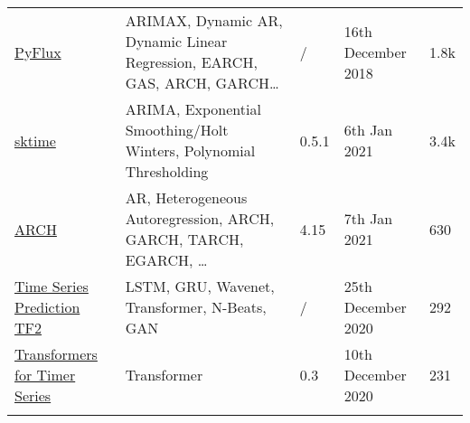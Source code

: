 \begin{table}[h]
{\begin{tabular}{lllll}
            \href{https://github.com/RJT1990/pyflux}{PyFlux}                                            & ARIMAX, Dynamic AR, Dynamic Linear Regression, EARCH, GAS, ARCH, GARCH\ldots                                                                                                                                                                                                                                                      & /         & 16th December 2018    & 1.8k  \\\addlinespace
            \href{https://github.com/alan-turing-institute/sktime}{sktime}                              & ARIMA, Exponential Smoothing/Holt Winters, Polynomial Thresholding                                                                                                                                                                                                                                                                & 0.5.1     & 6th Jan 2021          & 3.4k  \\\addlinespace
            \href{https://github.com/bashtage/arch}{ARCH}                                               & AR, Heterogeneous Autoregression, ARCH, GARCH, TARCH, EGARCH, \ldots                                                                                                                                                                                                                                                              & 4.15      & 7th Jan 2021          & 630   \\\addlinespace
            \href{https://github.com/LongxingTan/Time-series-prediction}{Time Series Prediction TF2}    & LSTM, GRU, Wavenet, Transformer, N-Beats, GAN                                                                                                                                                                                                                                                                                     & /         & 25th December 2020    & 292   \\\addlinespace
            \href{https://github.com/maxjcohen/transformer}{Transformers for Timer Series}              & Transformer                                                                                                                                                                                                                                                                                                                       & 0.3       & 10th December 2020    & 231   \\\addlinespace

\end{tabular}}
\end{table}
